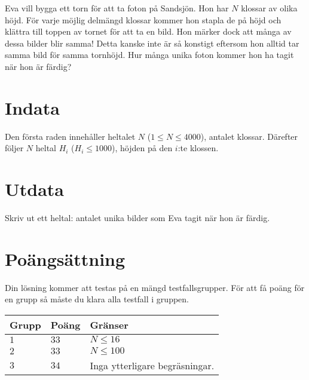 Eva vill bygga ett torn för att ta foton på Sandsjön. Hon har $N$ klossar av olika höjd.
För varje möjlig delmängd klossar kommer hon stapla de på höjd och klättra till toppen av tornet
för att ta en bild. Hon märker dock att många av dessa bilder blir samma! Detta kanske inte är så konstigt eftersom hon alltid tar samma bild för samma tornhöjd. Hur många unika foton kommer hon ha tagit när hon är färdig? 


\section*{Indata}
Den första raden innehåller heltalet $N$ ($1 \leq N \leq 4000$), antalet klossar.
Därefter följer $N$ heltal $H_i$ ($H_i \leq 1000$), höjden på den $i$:te klossen.
\section*{Utdata}
Skriv ut ett heltal: antalet unika bilder som Eva tagit när hon är färdig.

\section*{Poängsättning}
Din lösning kommer att testas på en mängd testfallsgrupper.
För att få poäng för en grupp så måste du klara alla testfall i gruppen.

\noindent
\begin{tabular}{| l | l | p{12cm} |}
  \hline
  \textbf{Grupp} & \textbf{Poäng} & \textbf{Gränser} \\ \hline
  $1$    & $33$      & $N \leq 16$ \\ \hline
  $2$    & $33$      & $N \leq 100$ \\ \hline
  $3$    & $34$      & Inga ytterligare begräsningar. \\ \hline
\end{tabular}
